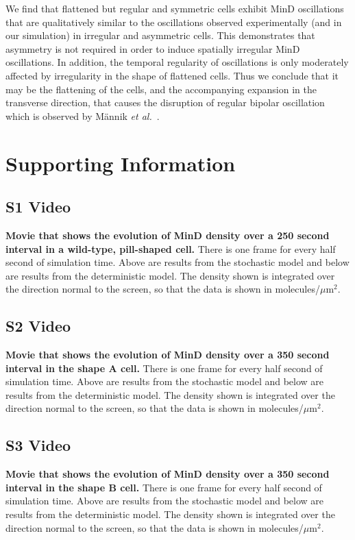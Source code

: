 \documentclass[10pt,letterpaper]{article}
\newcommand\micron{\ensuremath{\mu\text{m}}}
\begin{document}
We find that flattened but regular and symmetric cells exhibit MinD
oscillations that are qualitatively similar to the oscillations
observed experimentally (and in our simulation) in irregular and
asymmetric cells.  This demonstrates that asymmetry is not required in
order to induce spatially irregular MinD oscillations.  In addition,
the temporal regularity of oscillations is only moderately affected by
irregularity in the shape of flattened cells.  Thus we conclude that
it may be the flattening of the cells, and the accompanying
expansion in the transverse direction, that causes the disruption of
regular bipolar oscillation which is observed by M\"annik \emph{et
  al.}~\cite{mannik2012robustness}.


\section*{Supporting Information}

\subsection*{S1 Video}
\label{movie-MinD-density-pill}
{\bf Movie that shows the evolution of MinD density over a 250 second
  interval in a wild-type, pill-shaped cell.}  There is one frame for
every half second of simulation time. Above are results from the
stochastic model and below are results from the deterministic model.
The density shown is integrated over the direction normal to the
screen, so that the data is shown in molecules/$\micron^2$.

\subsection*{S2 Video}
\label{movie-MinD-density-shape-A}
{\bf Movie that shows the evolution of MinD density over a 350 second
  interval in the shape A cell.}  There is one frame for every half
second of simulation time. Above are results from the stochastic model
and below are results from the deterministic model.  The density shown
is integrated over the direction normal to the screen, so that the
data is shown in molecules/$\micron^2$.

\subsection*{S3 Video}
\label{movie-MinD-density-shape-B}
{\bf Movie that shows the evolution of MinD density over a 350 second
  interval in the shape B cell.}  There is one frame for every half
second of simulation time. Above are results from the stochastic model
and below are results from the deterministic model.  The density shown
is integrated over the direction normal to the screen, so that the
data is shown in molecules/$\micron^2$.
\end{document}
